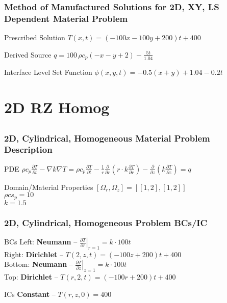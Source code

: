 \documentclass[]{beamer}
\begin{document}
\begin{frame}[t]\frametitle{Method of Manufactured Solutions for 2D, XY, LS Dependent Material Problem}
  \begin{block}{Prescribed Solution}
    $T(x,t) = (-100x-100y+200)t + 400$
  \end{block}
  
  \begin{block}{Derived Source}
  $q = 100\,\rho c_p \left(-x-y+2\right) - \frac{5t}{1.04}$
  \end{block}
  
  \begin{block}{Interface Level Set Function}
    $\phi(x,y,t) = -0.5(x+y) + 1.04 - 0.2t$
  \end{block}
\end{frame}


\section{2D RZ Homog}
\subsection{}
\begin{frame}[t]\frametitle{2D, Cylindrical, Homogeneous Material Problem Description}
  \begin{block}{PDE}
    $\rho c_p\frac{\partial T}{\partial t} - \nabla k \nabla T = 
    \rho c_p\frac{\partial T}{\partial t} - \frac{1}{r}\frac{\partial}{\partial r}
    \left(r\cdot k\frac{\partial T}{\partial r}\right) - \frac{\partial}{\partial z}
    \left(k\frac{\partial T}{\partial z}\right)= q$
  \end{block}
  
  \begin{block}{Domain/Material Properties}
  	$[\Omega_r,\Omega_z] = [[1,2],[1,2]]$ \\
  	$\rho cs_p = 10$ \\
  	$k=1.5$
  \end{block}
\end{frame}

\begin{frame}[t]\frametitle{2D, Cylindrical, Homogeneous Problem BCs/IC}
  \begin{block}{BCs}
    Left: \textbf{Neumann} -- $\left. \frac{\partial T}{\partial r}\right|_{r=1} = k\cdot 100t$ \\
    Right: \textbf{Dirichlet} -- $T(2,z,t) = (-100z + 200)t +400$ \\
    Bottom: \textbf{Neumann} -- $\left. \frac{\partial T}{\partial z}\right|_{z=1} = k\cdot 100t$ \\
    Top: \textbf{Dirichlet} -- $T(r,2,t) = (-100r + 200)t + 400$
  \end{block}
  
  \begin{block}{ICs}
    \textbf{Constant} -- $T(r,z,0) = 400$
  \end{block}
\end{frame}
\end{document}
